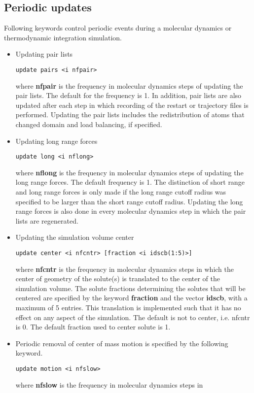 \subsection{Periodic updates}
Following keywords control periodic events during a molecular
dynamics or thermodynamic integration simulation.
\begin{itemize}
\item
Updating pair lists
\begin{verbatim}
update pairs <i nfpair>
\end{verbatim}
where {\bf nfpair} is the frequency in molecular dynamics steps of 
updating the pair lists. The default for the frequency is 1.
In addition, pair lists are also updated after each step in which
recording of the restart or trajectory files is performed. Updating
the pair lists includes the redistribution of atoms that changed
domain and load balancing, if specified.
\item
Updating long range forces
\begin{verbatim}
update long <i nflong>
\end{verbatim}
where {\bf nflong} is the frequency in molecular dynamics steps 
of updating the long range forces. The default frequency is 1.
The distinction of short range and long range forces is only
made if the long range cutoff radius was specified to be larger
than the short range cutoff radius. Updating the long range forces
is also done in every molecular dynamics step in which the
pair lists are regenerated.
\item
Updating the simulation volume center
\begin{verbatim}
update center <i nfcntr> [fraction <i idscb(1:5)>]
\end{verbatim}
where {\bf nfcntr} is the frequency in molecular dynamics steps in 
which the center of geometry of the solute(s) is translated to the
center of the simulation volume. The solute fractions determining the
solutes that will be centered are specified by the keyword 
{\bf fraction} and the vector {\bf idscb}, with a maximum of 5 entries.
This translation is implemented such that it has no effect on any 
aspect of the simulation. The default is not to center, i.e. nfcntr is
0. The default fraction used to center solute is 1.
\item
Periodic removal of center of mass motion is specified by the
following keyword.
\begin{verbatim}
update motion <i nfslow>
\end{verbatim}
where {\bf nfslow} is the frequency in molecular dynamics steps in

\end{itemize}

